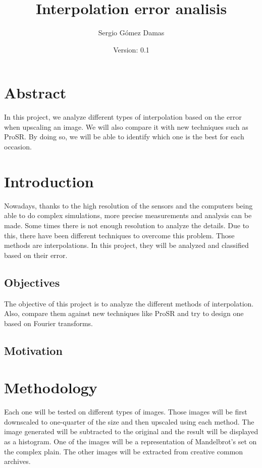 \documentclass[a4paper,12pt]{article}
\title{Interpolation error analisis}
\author{Sergio Gómez Damas}
\date{Version: 0.1}
\begin{document}
\maketitle
\newpage

\tableofcontents
\newpage

\section{Abstract}
  In this project, we analyze different types of interpolation based on the error when upscaling an image. We will also compare it with new techniques such as ProSR. By doing so, we will be able to identify which one is the best for each occasion.

%
%

\section{Introduction}\label{sec:introduction}
Nowadays, thanks to the high resolution of the sensors and the computers being able to do complex simulations, more precise measurements and analysis can be made. Some times there is not enough resolution to analyze the details. Due to this, there have been different techniques to overcome this problem. Those methods are interpolations. In this project, they will be analyzed and classified based on their error.
\subsection{Objectives}
The objective of this project is to analyze the different methods of interpolation. Also, compare them against new techniques like ProSR and try to design one based on Fourier transforms.
\subsection{Motivation}



%
%

\section{Methodology}\label{sec:methodology}
Each one will be tested on different types of images. Those images will be first downscaled to one-quarter of the size and then upscaled using each method. The image generated will be subtracted to the original and the result will be displayed as a histogram.
One of the images will be a representation of Mandelbrot's set on the complex plain. The other images will be extracted from creative common archives.
\end{document}
